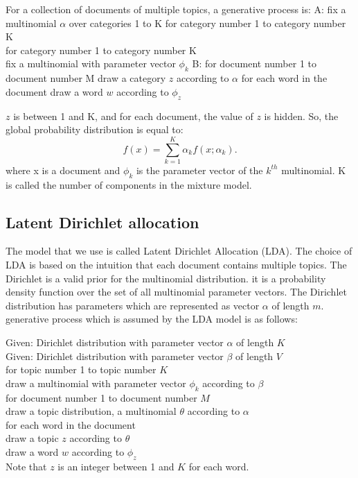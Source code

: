 \documentclass[twoside,12pt]{article}
\begin{document}
For a collection of documents of multiple topics, a generative process is:
A: fix a multinomial $\alpha$ over categories 1 to K for category number 1 to category number K \\
for category number 1 to category number K \\
fix a multinomial with parameter vector $\phi_k$
B: for document number 1 to document number M
draw a category $z$ according to $\alpha$
for each word in the document
draw a word $w$ according to $\phi_z$

$z$ is between 1 and K, and for each document, the value of $z$ is hidden. So, the global probability distribution is equal to:
\begin{equation}
f(x)=\sum_{k=1}^K \alpha_k f(x;\alpha_k).
\end{equation}
where x is a document and $\phi_k$ is the parameter vector of the $k^{th}$ multinomial. K is called the number of components in the mixture model. 

\subsection{Latent Dirichlet allocation}
The model that we use is called Latent Dirichlet Allocation (LDA). The choice of LDA is based on the intuition that each document contains multiple topics. The Dirichlet is a valid prior for the multinomial distribution. it is a probability density function over the set of all multinomial parameter vectors. The Dirichlet distribution has parameters which are represented as vector $\alpha$ of length $m$. generative process which is assumed by the LDA model is as follows:

Given: Dirichlet distribution with parameter vector $\alpha$ of length $K$ \\ 
Given: Dirichlet distribution with parameter vector $\beta$ of length $V$ \\
for topic number 1 to topic number $K$ \\ 
draw a multinomial with parameter vector $\phi_k$ according to $\beta$ \\
for document number 1 to document number $M$\\
draw a topic distribution, a multinomial $\theta$ according to $\alpha$ \\
for each word in the document \\
draw a topic $z$ according to $\theta$ \\
draw a word $w$ according to $\phi_z$ \\
Note that $z$ is an integer between 1 and $K$ for each word. 
\end{document}
